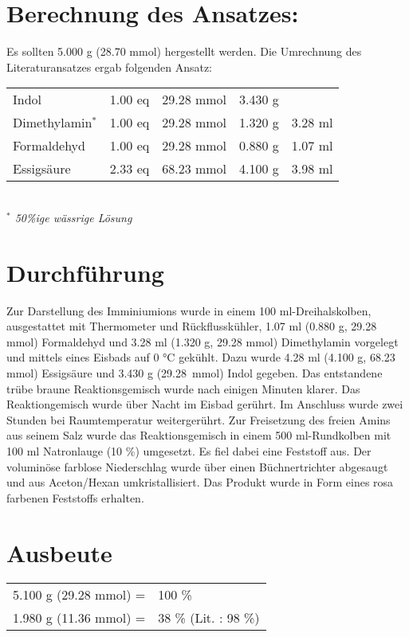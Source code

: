\documentclass[12pt]{article}
\begin{document}
\begin{onehalfspace}
\section{Berechnung des Ansatzes: } 
Es sollten 5.000 g (28.70 mmol)  hergestellt werden. Die Umrechnung des Literaturansatzes \cite{organikum} ergab folgenden Ansatz:\\[0.5cm]
\begin{tabular}{lrrrr}
Indol & 1.00 eq  & 29.28 mmol & 3.430 g & \\
Dimethylamin$^\ast$  & 1.00 eq  & 29.28 mmol &  1.320 g & 3.28 ml\\
Formaldehyd  & 1.00 eq & 29.28 mmol & 0.880 g & 1.07 ml\\
Essigsäure  & 2.33 eq  & 68.23 mmol& 4.100 g & 3.98 ml\\
\end{tabular}\\[0.5cm]
\footnotesize \textit{$^\ast$ 50\%ige wässrige Lösung} 
\normalsize \section{Durchführung \cite{organikum}} 
Zur Darstellung des Imminiumions wurde in einem 100 ml-Dreihalskolben, ausgestattet mit Thermometer und Rückflusskühler, 1.07 ml (0.880 g, 29.28 mmol) Formaldehyd und 3.28 ml (1.320 g, 29.28 mmol) Dimethylamin  vorgelegt und mittels eines Eisbads auf 0 \si{\celsius} gekühlt. Dazu wurde 4.28 ml (4.100 g, 68.23 mmol) Essigsäure und 3.430 g \mbox{(29.28 mmol)} Indol gegeben. Das entstandene trübe braune Reaktionsgemisch wurde nach einigen Minuten klarer. Das Reaktiongemisch wurde über Nacht im Eisbad gerührt. Im Anschluss wurde zwei Stunden bei Raumtemperatur weitergerührt. Zur Freisetzung des freien Amins aus seinem Salz wurde das Reaktionsgemisch in einem 500 ml-Rundkolben mit 100 ml Natronlauge (10 \si{\percent}) umgesetzt. Es fiel dabei eine Feststoff aus. Der voluminöse farblose Niederschlag wurde über einen Büchnertrichter abgesaugt und aus Aceton/Hexan umkristallisiert. Das Produkt wurde in Form eines rosa farbenen Feststoffs erhalten.
\section{Ausbeute} 
\begin{tabular}{ rl}
  5.100 g (29.28 mmol) =  & 100 \%\\
  1.980 g (11.36 mmol) =  & 38 \% (Lit.\cite{organikum} : 98 \%) \\
 \end{tabular}

\end{onehalfspace}
\end{document}
